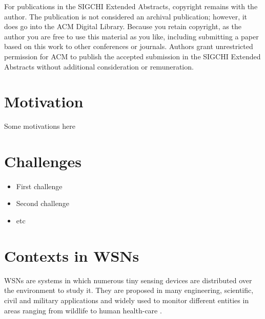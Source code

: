 \documentclass{ubicomp-ext}
\begin{document}
For publications in the SIGCHI Extended Abstracts, copyright remains with the author.  
The publication is not considered an archival publication; however, it does go into the ACM Digital Library. 
Because you retain copyright, as the author you are free to use this material as you like, including submitting a paper based on this work to other conferences or journals.  
Authors grant unrestricted permission for ACM to publish the accepted submission in the SIGCHI Extended Abstracts without additional consideration or remuneration.

\section{Motivation}

Some motivations here


\section{Challenges}
\paragraph{}

\begin{itemize}\compresslist
\item 	
First challenge
\item 	
Second challenge
\item 	
etc
\end{itemize}


\section{Contexts in WSNs}
WSNs are systems in which numerous tiny sensing devices are distributed over the environment to study it. They are proposed in many engineering, scientific,  civil and military applications and widely used to monitor different entities in areas ranging from wildlife \cite{juang02} \cite{lingren08} \cite{pastor08} to human health-care \cite{lorincz09} \cite{alemdar10}.
\end{document}
